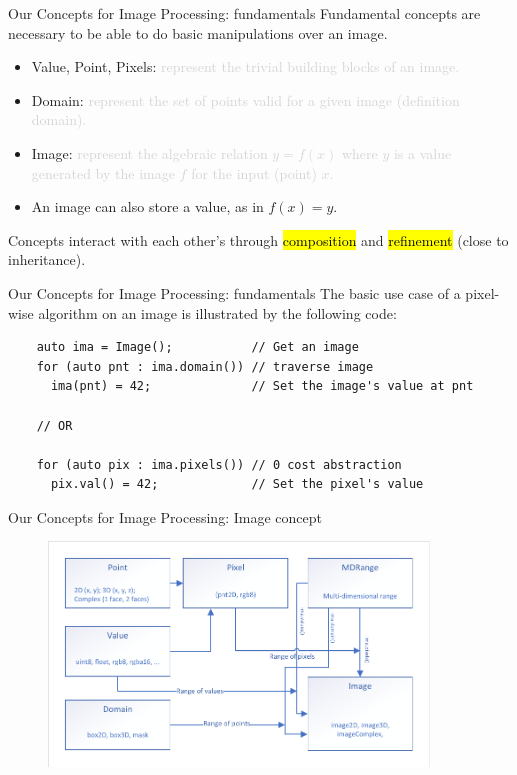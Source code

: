 \documentclass[12pt,aspectratio=169]{beamer}
\makeatletter
\newcommand{\GRAYOUT}[1]{\textcolor{lightgray}{#1}}%
\let\HL\hl
\renewcommand\hl{%
  \let\set@color\beamerorig@set@color
  \let\reset@color\beamerorig@reset@color
  \HL}
\makeatother
\begin{document}
\begin{frame}[fragile]{Our Concepts for Image Processing: fundamentals}
  Fundamental concepts are necessary to be able to do basic manipulations over an image.
  \begin{itemize}
    \item Value, Point, Pixels: \GRAYOUT{represent the trivial building blocks of an image.}
    \item Domain: \GRAYOUT{represent the set of points valid for a given image (definition domain).}
    \item Image: \GRAYOUT{represent the algebraic relation \(y = f(x)\) where \(y\) is a value generated by the image \(f\) for
            the input (point) \(x\).}
    \item An image can also store a value, as in \(f(x) = y\).
  \end{itemize}
  Concepts interact with each other's through \hl{composition} and \hl{refinement} (close to inheritance).
\end{frame}

\begin{frame}[fragile]{Our Concepts for Image Processing: fundamentals}
  The basic use case of a pixel-wise algorithm on an image is illustrated by the following code:
  \begin{verbatim}
    auto ima = Image();           // Get an image
    for (auto pnt : ima.domain()) // traverse image
      ima(pnt) = 42;              // Set the image's value at pnt
    
    // OR

    for (auto pix : ima.pixels()) // 0 cost abstraction
      pix.val() = 42;             // Set the pixel's value
  \end{verbatim}
\end{frame}

\begin{frame}[fragile]{Our Concepts for Image Processing: Image concept}
  \centering
  \begin{figure}
    \includegraphics[width=0.9\textwidth]{../figures/concepts/image}
  \end{figure}
\end{frame}
\end{document}
